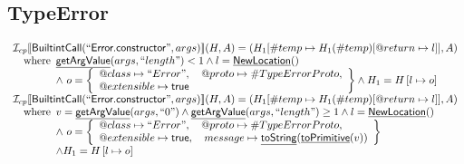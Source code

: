 \documentclass{article}
\makeatletter
\newcommand{\SF}[1]{\mbox{\textsf{#1}}}
\newcommand{\wherec}[1]{{\rm where}\begin{array}[t]{l}#1\end{array}}
\newcommand{\I}{\mathcal{I}}
\newcommand{\set}[1]{\left\{\begin{array}{l}#1\end{array}\right\}}
\newcommand{\lbr}{\llbracket}
\newcommand{\rbr}{\rrbracket}
\newcommand{\hf}[1]{\underline{\sf #1}}
\newcommand{\varprop}[1]{@#1}
\newcommand{\vtrue}{\SF{true}}
\makeatother
\begin{document}
\subsection{TypeError}
\[
\begin{array}{l}
\I _{cp}\lbr \SF{BuiltintCall}(``\SF{Error.constructor}",args)\rbr(H,A)
  = (H_1[\#temp \mapsto H_1(\#temp)[@return \mapsto l]], A)\\
\quad\wherec{
  \hf{getArgValue}(args, ``length") < 1 
  \land l=\hf{NewLocation}()\\
  \land\ o = \set{
    \varprop{class}\mapsto ``Error", \quad
    \varprop{proto}\mapsto \#TypeErrorProto,\\
    \varprop{extensible}\mapsto \vtrue
    }
  \land H_1=H\left[l\mapsto o\right]\\
  }\\
  
\I _{cp}\lbr \SF{BuiltintCall}(``\SF{Error.constructor}",args)\rbr(H,A)
  = (H_1[\#temp \mapsto H_1(\#temp)[@return \mapsto l]], A)\\
\quad\wherec{
  v = \hf{getArgValue}(args, ``0") \land \hf{getArgValue}(args, ``length") \geq 1
  \land l=\hf{NewLocation}()\\
  \land\ o = \set{
    \varprop{class}\mapsto ``Error", \quad
    \varprop{proto}\mapsto \#TypeErrorProto,\\
    \varprop{extensible}\mapsto \vtrue,  \quad
    message \mapsto \hf{toString}(\hf{toPrimitive}(v)) 
    }\\
  \land H_1=H\left[l\mapsto o\right]
  }\\

\end{array}
\]
\end{document}
